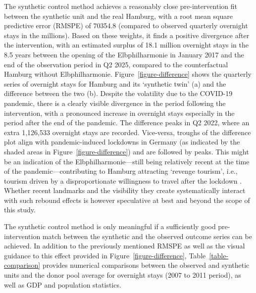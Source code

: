\documentclass[a4paper, 12pt]{article}
\begin{document}
The synthetic control method achieves a reasonably close pre-intervention fit between the synthetic unit and the real Hamburg, with a root mean square predictive error (RMSPE) of 70354.8 (compared to observed quarterly overnight stays in the millions). Based on these weights, it finds a positive divergence after the intervention, with an estimated surplus of 18.1 million overnight stays in the 8.5 years between the opening of the Elbphilharmonie in January 2017 and the end of the observation period in Q2 2025, compared to the counterfactual Hamburg without Elbphilharmonie. Figure~\ref{figure-difference} shows the quarterly series of overnight stays for Hamburg and its `synthetic twin' (a) and the difference between the two (b). Despite the volatility due to the COVID-19 pandemic, there is a clearly visible divergence in the period following the intervention, with a pronounced increase in overnight stays especially in the period after the end of the pandemic. The difference peaks in Q2 2022, where an extra 1,126,533 overnight stays are recorded. Vice-versa, troughs of the difference plot align with pandemic-induced lockdowns in Germany (as indicated by the shaded areas in Figure~\ref{figure-difference}) and are followed by peaks. This might be an indication of the Elbphilharmonie---still being relatively recent at the time of the pandemic---contributing to Hamburg attracting `revenge tourism', i.e., tourism driven by a disproportionate willingness to travel after the lockdown \citep{vogler2022}. Whether recent landmarks and the visibility they create systematically interact with such rebound effects is however speculative at best and beyond the scope of this study.

The synthetic control method is only meaningful if a sufficiently good pre-intervention match between the synthetic and the observed outcome series can be achieved. In addition to the previously mentioned RMSPE as well as the visual guidance to this effect provided in Figure~\ref{figure-difference}, Table~\ref{table-comparison} provides numerical comparisons between the observed and synthetic units and the donor pool average for overnight stays (2007 to 2011 period), as well as GDP and population statistics.
\end{document}

